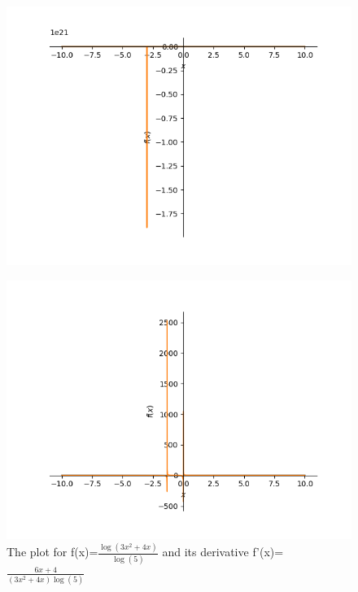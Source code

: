 \documentclass{article}
\begin{document}
\begin{figure}
\centering
\includegraphics{plot_38}
\end{figure}\begin{figure}
\caption{The plot for f(x)=$\frac{\log{\left(3 x^{2} + 4 x \right)}}{\log{\left(5 \right)}}$ and its derivative f'(x)=$\frac{6 x + 4}{\left(3 x^{2} + 4 x\right) \log{\left(5 \right)}}$}
\centering
\includegraphics{plot_39}
\end{figure}
\end{document}
